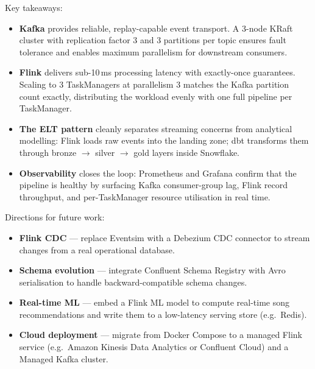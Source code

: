 Key takeaways:
\begin{itemize}
  \item \textbf{Kafka} provides reliable, replay-capable event transport. A 3-node KRaft cluster
        with replication factor 3 and 3 partitions per topic ensures fault tolerance and enables
        maximum parallelism for downstream consumers.
  \item \textbf{Flink} delivers sub-10\,ms processing latency with exactly-once guarantees.
        Scaling to 3 TaskManagers at parallelism 3 matches the Kafka partition count exactly,
        distributing the workload evenly with one full pipeline per TaskManager.
  \item \textbf{The ELT pattern} cleanly separates streaming concerns from analytical modelling:
        Flink loads raw events into the landing zone; dbt transforms them through
        bronze $\to$ silver $\to$ gold layers inside Snowflake.
  \item \textbf{Observability} closes the loop: Prometheus and Grafana confirm that the pipeline
        is healthy by surfacing Kafka consumer-group lag, Flink record throughput, and
        per-TaskManager resource utilisation in real time.
\end{itemize}

Directions for future work:
\begin{itemize}
  \item \textbf{Flink CDC} — replace Eventsim with a Debezium CDC connector to stream changes from a real operational database.
  \item \textbf{Schema evolution} — integrate Confluent Schema Registry with Avro serialisation to handle backward-compatible schema changes.
  \item \textbf{Real-time ML} — embed a Flink ML model to compute real-time song recommendations and write them to a low-latency serving store (e.g.\ Redis).
  \item \textbf{Cloud deployment} — migrate from Docker Compose to a managed Flink service (e.g.\ Amazon Kinesis Data Analytics or Confluent Cloud) and a Managed Kafka cluster.
\end{itemize}
